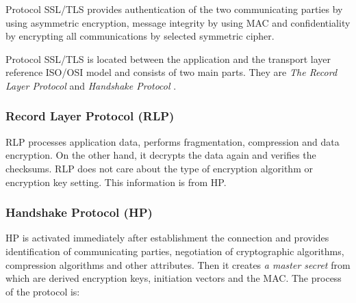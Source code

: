 \documentclass[
  twoside, 12pt, 
  printed, %
  notable,   %
  lof,     %
  lot,     %
]{fithesis3}
\begin{document}
Protocol SSL/TLS provides authentication of the two communicating parties by using asymmetric 
encryption, message integrity by using MAC and confidentiality by encrypting all 
communications by selected symmetric cipher.

Protocol SSL/TLS is located between the application and the transport layer reference ISO/OSI 
model and consists of two main parts. They are \textit{The Record Layer Protocol} and 
\textit{Handshake Protocol} \cite{oppliger2003security}. %

\subsubsection{Record Layer Protocol (RLP)}

RLP processes application data, performs fragmentation, compression and data encryption. On the 
other hand, it decrypts the data again and verifies the checksums. RLP does not care about the 
type of encryption algorithm or encryption key setting. This information is from HP.

\subsubsection{Handshake Protocol (HP)}
HP is activated immediately after establishment the connection and provides identification of 
communicating parties, negotiation of cryptographic algorithms, compression algorithms and other 
attributes. Then it creates \textit{a master secret} from which are derived encryption keys, 
initiation vectors and the MAC. The process of the protocol is:
\end{document}

